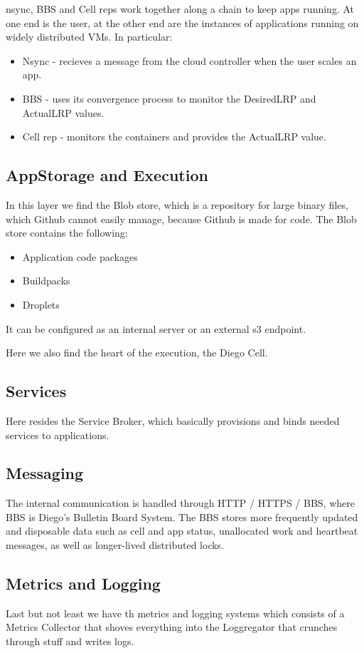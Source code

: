 nsync, BBS and Cell reps work together along a chain to keep apps running. At one end is the user, at the other end are the instances of applications running on widely distributed VMs. In particular:
\begin{itemize}
	\item Nsync - recieves a message from the cloud controller when the user scales an app.
	\item BBS - uses its convergence process to monitor the DesiredLRP and ActualLRP values.
	\item Cell rep - monitors the containers and provides the ActualLRP value.
\end{itemize}

\subsection{AppStorage and Execution}
In this layer we find the Blob store, which is a repository for large binary files, which Github cannot easily manage, because Github is made for code. The Blob store contains the following:
\begin{itemize}
	\item Application code packages
	\item Buildpacks
	\item Droplets
\end{itemize}
It can be configured as an internal server or an external s3 endpoint.

Here we also find the heart of the execution, the Diego Cell.

\subsection{Services}
Here resides the Service Broker, which basically provisions and binds needed services to applications.

\subsection{Messaging}
The internal communication is handled through HTTP / HTTPS / BBS, where BBS is Diego's Bulletin Board System. The BBS stores more frequently updated and disposable data such as cell and app status, unallocated work and heartbeat messages, as well as longer-lived distributed locks.

\subsection{Metrics and Logging}
Last but not least we have th metrics and logging systems which consists of a Metrics Collector that shoves everything into the Loggregator that crunches through stuff and writes logs.

